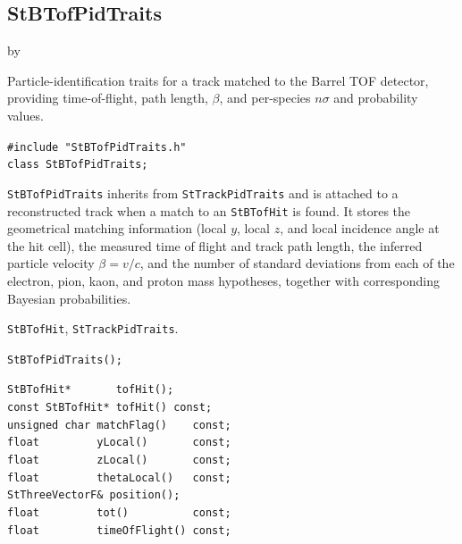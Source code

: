 \documentclass[twoside]{article}
\newcommand{\entrylabel}[1]{\mbox{\textbf{{#1}}}\hfil}%
\newenvironment{entry}
{\begin{list}{}%
    {\renewcommand{\makelabel}{\entrylabel}%
     \setlength{\labelwidth}{90pt}%
     \setlength{\leftmargin}{\labelwidth}
     \advance\leftmargin by \labelsep%
      }%
    }%
  {\end{list}}
\newcommand{\Entrylabel}[1]%
{\raisebox{0pt}[1ex][0pt]{\makebox[\labelwidth][l]%
    {\parbox[t]{\labelwidth}{\hspace{0pt}\textbf{{#1}}}}}}
\newenvironment{Entry}%
{\renewcommand{\entrylabel}{\Entrylabel}\begin{entry}}%
  {\end{entry}}
\begin{document}
\clearpage

\subsection{StBTofPidTraits}
\label{sec:StBTofPidTraits}
\begin{Entry}
\item[Summary] Particle-identification traits for a track matched to the
    Barrel TOF detector, providing time-of-flight, path length, $\beta$, and
    per-species $n\sigma$ and probability values.
\item[Synopsis]
    \verb+#include "StBTofPidTraits.h"+\\
    \verb+class StBTofPidTraits;+\\
\item[Description]
    \texttt{StBTofPidTraits} inherits from \texttt{StTrackPidTraits} and is
    attached to a reconstructed track when a match to an \texttt{StBTofHit} is
    found.  It stores the geometrical matching information (local $y$, local $z$,
    and local incidence angle at the hit cell), the measured time of flight and
    track path length, the inferred particle velocity $\beta = v/c$, and the
    number of standard deviations from each of the electron, pion, kaon, and
    proton mass hypotheses, together with corresponding Bayesian probabilities.
\item[Related Classes]
    \texttt{StBTofHit}, \texttt{StTrackPidTraits}.
\item[Public\\ Constructors]
    \verb+StBTofPidTraits();+\\
\item[Public Member\\ Functions]
    \verb+StBTofHit*       tofHit();+\\
    \verb+const StBTofHit* tofHit() const;+\\
    \verb+unsigned char matchFlag()    const;+\\
    \verb+float         yLocal()       const;+\\
    \verb+float         zLocal()       const;+\\
    \verb+float         thetaLocal()   const;+\\
    \verb+StThreeVectorF& position();+\\
    \verb+float         tot()          const;+\\
    \verb+float         timeOfFlight() const;+\\

\end{Entry}
\end{document}
